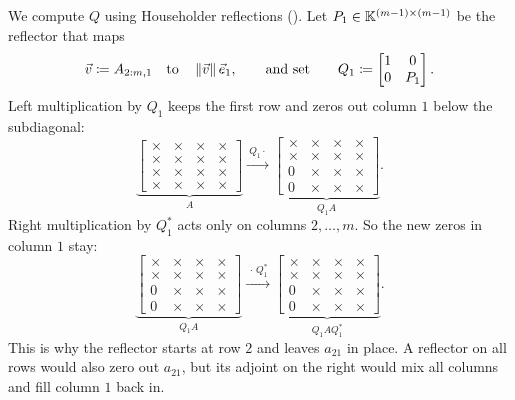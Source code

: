 We compute $Q$ using Householder reflections (). Let $P_1 \in \mathbb{K}^{(m-1) \times (m-1)}$ be the reflector that maps
\begin{equation}
  \vec{v} \coloneqq A_{2:m,1} \quad\text{to}\quad \left\lVert \vec{v} \right\rVert\vec{e}_1, \qquad\text{and set}\qquad Q_1 \coloneqq \begin{bmatrix} 1 & 0 \\ 0 & P_1 \end{bmatrix}.
\end{equation}
Left multiplication by $Q_1$ keeps the first row and zeros out column $1$ below the subdiagonal:
\begin{equation}
  \underbrace{\begin{bmatrix} \times & \times & \times & \times \\ \times & \times & \times & \times \\ \times & \times & \times & \times \\ \times & \times & \times & \times \end{bmatrix}}_{A}
  \xrightarrow{\ Q_1 \cdot\ }
  \underbrace{\begin{bmatrix} \times & \times & \times & \times \\ \times & \times & \times & \times \\ 0 & \times & \times & \times \\ 0 & \times & \times & \times \end{bmatrix}}_{Q_1A}.
\end{equation}
Right multiplication by $Q_1^\ast$ acts only on columns $2, \dots, m$. So the new zeros in column $1$ stay:
\begin{equation}
  \underbrace{\begin{bmatrix} \times & \times & \times & \times \\ \times & \times & \times & \times \\ 0 & \times & \times & \times \\ 0 & \times & \times & \times \end{bmatrix}}_{Q_1A}
  \xrightarrow{\ \cdot\, Q_1^\ast\ }
  \underbrace{\begin{bmatrix} \times & \times & \times & \times \\ \times & \times & \times & \times \\ 0 & \times & \times & \times \\ 0 & \times & \times & \times \end{bmatrix}}_{Q_1AQ_1^\ast}.
\end{equation}
This is why the reflector starts at row $2$ and leaves $a_{21}$ in place. A reflector on all rows would also zero out $a_{21}$, but its adjoint on the right would mix all columns and fill column $1$ back in.


